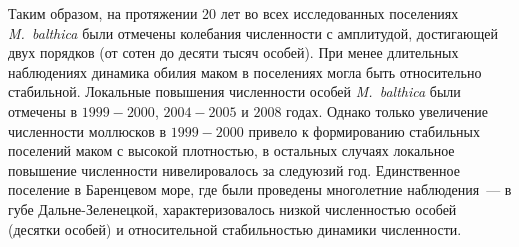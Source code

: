 \bigskip
Таким образом, на протяжении $20$ лет во всех исследованных поселениях \textit{M.~balthica} были отмечены колебания численности с амплитудой, достигающей двух порядков (от сотен до десяти тысяч особей).
При менее длительных наблюдениях динамика обилия маком в поселениях могла быть относительно стабильной.
Локальные повышения численности особей \textit{M.~balthica} были отмечены в $1999-2000$, $2004-2005$ и $2008$ годах.
Однако только увеличение численности моллюсков в $1999-2000$ привело к формированию стабильных поселений маком с высокой плотностью, в остальных случаях локальное повышение численности нивелировалось за следуюзий год.
Единственное поселение в Баренцевом море, где были проведены многолетние наблюдения~--- в губе Дальне-Зеленецкой, характеризовалось низкой численностью особей (десятки особей) и относительной стабильностью динамики численности. 



\afterpage{\clearpage}




